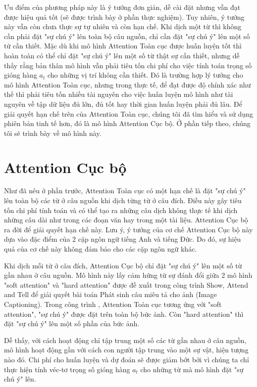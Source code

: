 Ưu điểm của phương pháp này là ý tưởng đơn giản, dễ cài đặt nhưng vẫn đạt được hiệu quả tốt (sẽ được trình bày ở phần thực nghiệm). Tuy nhiên, ý tưởng này vẫn còn chưa thực sự tự nhiên và còn hạn chế. Khi dịch một từ thì không cần phải đặt "sự chú ý" lên toàn bộ câu nguồn, chỉ cần đặt "sự chú ý" lên một số từ cần thiết. Mặc dù khi mô hình Attention Toàn cục được huấn luyện tốt thì hoàn toàn có thể chỉ đặt "sự chú ý" lên một số từ thật sự cần thiết, nhưng dễ thấy rằng bản thân mô hình vẫn phải tiêu tốn chi phí cho việc tính toán trọng số gióng hàng $a_t$ cho những vị trí không cần thiết. Đó là trường hợp lý tưởng cho mô hình Attention Toàn cục, nhưng trong thực tế, để đạt được độ chính xác như thế thì phải tiêu tốn nhiều tài nguyên cho việc huấn luyện mô hình như tài nguyên về tập dữ liệu đủ lớn, đủ tốt hay thời gian huấn luyện phải đủ lâu.
Để giải quyết hạn chế trên của Attention Toàn cục, chúng tôi đã tìm hiểu và sử dụng phiên bản tinh tế hơn, đó là mô hình Attention Cục bộ. Ở phần tiếp theo, chúng tôi sẽ trình bày về mô hình này.

\section{Attention Cục bộ}
Như đã nêu ở phần trước, Attention Toàn cục có một hạn chế là đặt "sự chú ý" lên toàn bộ các từ ở câu nguồn khi dịch từng từ ở câu đích. Điều này gây tiêu tốn chi phí tính toán và có thể tạo ra những câu dịch không thực tế khi dịch những câu dài như trong các đoạn văn hay trong một tài liệu. Attention Cục bộ ra đời để giải quyết hạn chế này. Lưu ý, ý tưởng của cơ chế Attention Cục bộ này dựa vào đặc điểm của 2 cặp ngôn ngữ tiếng Anh và tiếng Đức. Do đó, sự hiệu quả của cơ chế này không đảm bảo cho các cặp ngôn ngữ khác.

Khi dịch mỗi từ ở câu đích, Attention Cục bộ chỉ đặt "sự chú ý" lên một số từ gần nhau ở câu nguồn. Mô hình này lấy cảm hứng từ sự đánh đổi giữa 2 mô hình "soft attention" và "hard attention" được đề xuất trong công trình Show, Attend and Tell \cite{showattendandtellXu2015} để giải quyết bài toán Phát sinh câu miêu tả cho ảnh (Image Captioning). Trong công trình \cite{showattendandtellXu2015}, Attention Toàn cục tương ứng với "soft attention", "sự chú ý" được đặt trên toàn bộ bức ảnh. Còn "hard attention" thì đặt "sự chú ý" lên một số phần của bức ảnh.

Dễ thấy, với cách hoạt động chỉ tập trung một số các từ gần nhau ở câu nguồn, mô hình hoạt động gần với cách con người tập trung vào một sự vật, hiện tượng nào đó. Chi phí cho huấn luyện và dự đoán sẽ được giảm bớt bởi vì chúng ta chỉ thực hiện tính véc-tơ trọng số gióng hàng $a_t$ cho những từ mà mô hình đặt "sự chú ý" lên.

